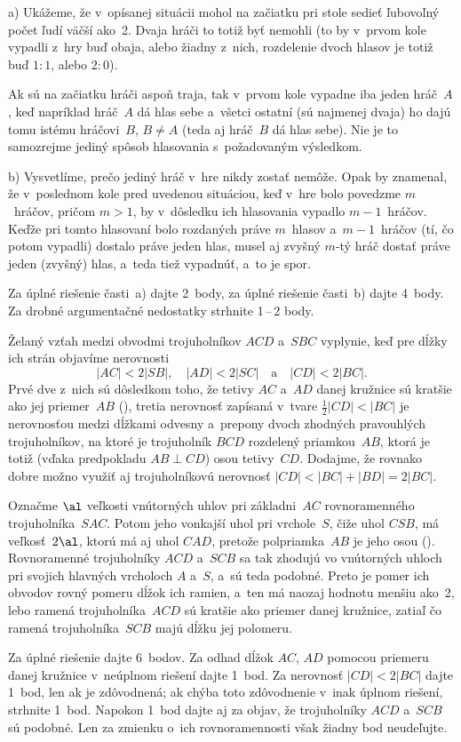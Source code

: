{%
a) Ukážeme, že v~opísanej situácii mohol na začiatku pri stole
sedieť ľubovoľný počet ľudí väčší ako~2. Dvaja hráči to totiž byť nemohli
(to by v~prvom kole vypadli z~hry buď obaja, alebo žiadny
z~nich, rozdelenie dvoch hlasov je totiž buď $1:1$, alebo $2:0$).

Ak sú na začiatku hráči aspoň traja, tak v~prvom kole vypadne iba
jeden hráč~$A$, keď napríklad hráč~$A$ dá hlas sebe
a~všetci ostatní (sú najmenej dvaja) ho dajú tomu istému hráčovi~$B$, $B\ne A$
(teda aj hráč~$B$ dá hlas sebe). Nie je to samozrejme jediný spôsob
hlasovania s~požadovaným výsledkom.

b) Vysvetlíme, prečo jediný hráč v~hre nikdy zostať nemôže.
Opak by znamenal, že v~poslednom kole pred uvedenou situáciou, keď
v~hre bolo
povedzme $m$~hráčov, pričom $m>1$, by v~dôsledku ich
hlasovania vypadlo $m-1$~hráčov. Keďže pri tomto
hlasovaní bolo rozdaných práve $m$~hlasov a~$m-1$~hráčov
(tí, čo potom vypadli) dostalo práve jeden hlas,
musel aj zvyšný $m$-tý hráč dostať práve jeden (zvyšný) hlas,
a~teda tiež vypadnúť, a~to je spor.

\nobreak\medskip\petit\noindent
Za úplné riešenie časti~a) dajte 2~body, za
úplné riešenie časti~b) dajte 4~body. Za drobné argumentačné
nedostatky strhnite 1\,--\,2 body.

\endpetit
\bigbreak}

{%
Želaný vzťah medzi obvodmi trojuholníkov $ACD$ a~$SBC$ vyplynie, keď
pre dĺžky ich strán objavíme nerovnosti
$$
|AC|<2|SB|,\quad|AD|<2|SC|\quad\text{a}\quad|CD|<2|BC|.
$$
Prvé dve z~nich sú dôsledkom toho, že tetivy $AC$ a~$AD$ danej
kružnice sú kratšie ako jej priemer~$AB$ (\obr), tretia nerovnosť zapísaná v~tvare $\frac12|CD|<|BC|$ je nerovnosťou medzi dĺžkami odvesny
a~prepony dvoch zhodných pravouhlých trojuholníkov, na ktoré je trojuholník $BCD$
rozdelený priamkou~$AB$, ktorá je totiž (vďaka predpokladu ${AB\perp CD}$) osou tetivy~$CD$. Dodajme, že rovnako dobre možno využiť
aj trojuholníkovú nerovnosť $|CD|<|BC|+|BD|=2|BC|$.
%

\ineriesenie
Označme $\al$ veľkosti vnútorných uhlov pri základni~$AC$ rovnoramenného
trojuholníka~$SAC$. Potom jeho vonkajší uhol pri vrchole~$S$, čiže uhol $CSB$,
má veľkosť~$2\al$, ktorú má aj uhol $CAD$, pretože
polpriamka~$AB$ je jeho osou ().
Rovnoramenné trojuholníky $ACD$ a~$SCB$ sa
tak zhodujú vo vnútorných uhloch pri svojich hlavných
vrcholoch $A$ a~$S$, a~sú teda podobné. Preto
je pomer ich obvodov rovný pomeru dĺžok ich ramien, a~ten má
naozaj hodnotu menšiu ako~2, lebo ramená trojuholníka~$ACD$
sú kratšie ako priemer danej kružnice, zatiaľ čo ramená
trojuholníka~$SCB$ majú dĺžku jej polomeru.

\nobreak\medskip\petit\noindent
Za úplné riešenie dajte 6~bodov. Za odhad dĺžok $AC$, $AD$ pomocou
priemeru danej kružnice v~neúplnom riešení dajte 1~bod. Za
nerovnosť $|CD|<2|BC|$ dajte 1~bod, len ak je zdôvodnená;
ak chýba toto zdôvodnenie v~inak úplnom riešení, strhnite 1~bod.
Napokon 1~bod dajte aj za objav, že trojuholníky $ACD$ a~$SCB$ sú podobné.
Len za zmienku o~ich rovnoramennosti však žiadny bod neudeľujte.

\endpetit
\bigbreak
}

